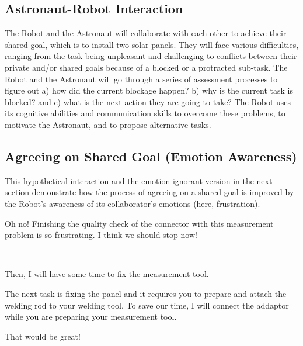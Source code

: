 \subsection{Astronaut-Robot Interaction}

The Robot and the Astronaut will collaborate with each other to achieve their
shared goal, which is to install two solar panels. They will face various
difficulties, ranging from the task being unpleasant and challenging to
conflicts between their private and/or shared goals because of a blocked or a
protracted sub-task. The Robot and the Astronaut will go through a series of
assessment processes to figure out a) how did the current blockage happen? b)
why is the current task is blocked? and c) what is the next action they are
going to take? The Robot uses its cognitive abilities and communication skills
to overcome these problems, to motivate the Astronaut, and to propose
alternative tasks.

\subsection{Agreeing on Shared Goal (Emotion Awareness)}
\label{sec:exp1}

This hypothetical interaction and the emotion ignorant version in the next
section demonstrate how the process of agreeing on a shared goal is improved by
the Robot's awareness of its collaborator's emotions (here, frustration).

\begin{description}
  \item \textit{\textbf{\fontsize{9pt}{12pt}\selectfont{A1. Astronaut:}}} Oh
  no! Finishing the quality check of the connector with this measurement
  problem is so frustrating. I think we should stop now!\\

  \item {}\\
  
  \item \textit{\textbf{\fontsize{9pt}{12pt}\selectfont{A3. Astronaut:}}} Then,
  I will have some time to fix the measurement tool.\\

  \item \textit{\textbf{\fontsize{9pt}{12pt}\selectfont{A4. Robot:}}} The next
  task is fixing the panel and it requires you to prepare and attach the welding
  rod to your welding tool. To save our time, I will connect the addaptor while
  you are preparing your measurement tool.\\

  \item \textit{\textbf{\fontsize{9pt}{12pt}\selectfont{A5. Astronaut:}}} That
  would be great!
  
\end{description}


